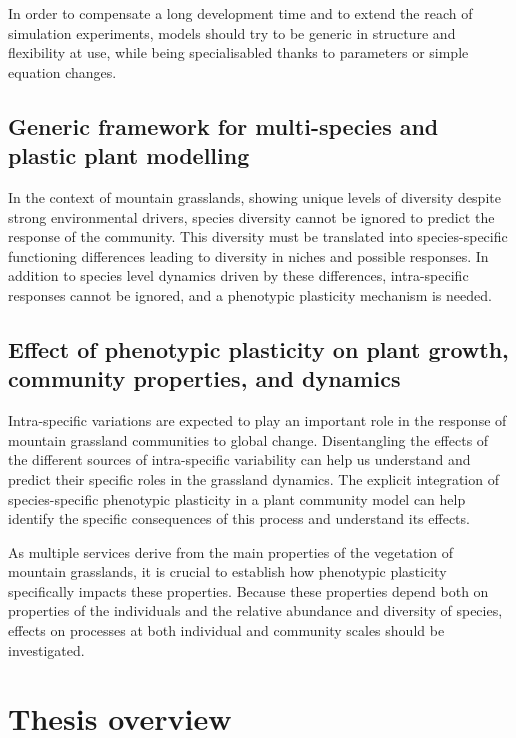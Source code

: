 In order to compensate a long development time and to extend the reach of simulation experiments, models should try to be generic in structure and flexibility at use, while being specialisabled thanks to parameters or simple equation changes.

\subsection{Generic framework for multi-species and plastic plant modelling} %

In the context of mountain grasslands, showing unique levels of diversity despite strong environmental drivers, species diversity cannot be ignored to predict the response of the community. This diversity must be translated into species-specific functioning differences leading to diversity in niches and possible responses. In addition to species level dynamics driven by these differences, intra-specific responses cannot be ignored, and a phenotypic plasticity mechanism is needed.




\subsection{Effect of phenotypic plasticity on plant growth, community properties, and dynamics}

Intra-specific variations are expected to play an important role in the response of mountain grassland communities to global change. Disentangling the effects of the different sources of intra-specific variability can help us understand and predict their specific roles in the grassland dynamics. The explicit integration of species-specific phenotypic plasticity in a plant community model can help identify the specific consequences of this process and understand its effects.

As multiple services derive from the main properties of the vegetation of mountain grasslands, it is crucial to establish how phenotypic plasticity specifically impacts these properties. Because these properties depend both on properties of the individuals and the relative abundance and diversity of species, effects on processes at both individual and community scales should be investigated.


\section{Thesis overview}

